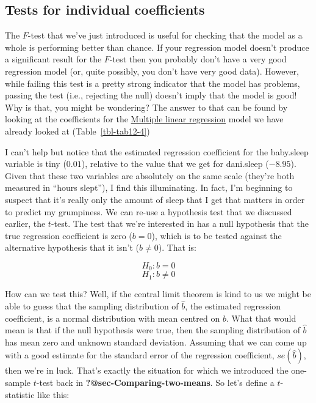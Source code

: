 \documentclass[
  a4paper,
]{book}
\begin{document}
\hypertarget{tests-for-individual-coefficients}{%
\subsection{Tests for individual
coefficients}\label{tests-for-individual-coefficients}}

The \(F\)-test that we've just introduced is useful for checking that
the model as a whole is performing better than chance. If your
regression model doesn't produce a significant result for the \(F\)-test
then you probably don't have a very good regression model (or, quite
possibly, you don't have very good data). However, while failing this
test is a pretty strong indicator that the model has problems, passing
the test (i.e., rejecting the null) doesn't imply that the model is
good! Why is that, you might be wondering? The answer to that can be
found by looking at the coefficients for the
\protect\hyperlink{multiple-linear-regression}{Multiple linear
regression} model we have already looked at (Table~\ref{tbl-tab12-4})

I can't help but notice that the estimated regression coefficient for
the baby.sleep variable is tiny (\(0.01\)), relative to the value that
we get for dani.sleep (\(-8.95\)). Given that these two variables are
absolutely on the same scale (they're both measured in ``hours slept''),
I find this illuminating. In fact, I'm beginning to suspect that it's
really only the amount of sleep that I get that matters in order to
predict my grumpiness. We can re-use a hypothesis test that we discussed
earlier, the \(t\)-test. The test that we're interested in has a null
hypothesis that the true regression coefficient is zero (\(b = 0\)),
which is to be tested against the alternative hypothesis that it isn't
(\(b \neq 0\)). That is:

\[H_0:b=0\] \[H_1:b \neq 0\]

How can we test this? Well, if the central limit theorem is kind to us
we might be able to guess that the sampling distribution of \(\hat{b}\),
the estimated regression coefficient, is a normal distribution with mean
centred on \(b\). What that would mean is that if the null hypothesis
were true, then the sampling distribution of \(\hat{b}\) has mean zero
and unknown standard deviation. Assuming that we can come up with a good
estimate for the standard error of the regression coefficient,
\(se(\hat{b})\), then we're in luck. That's exactly the situation for
which we introduced the one-sample \(t\)-test back in
\textbf{?@sec-Comparing-two-means}. So let's define a \(t\)-statistic
like this:
\end{document}
